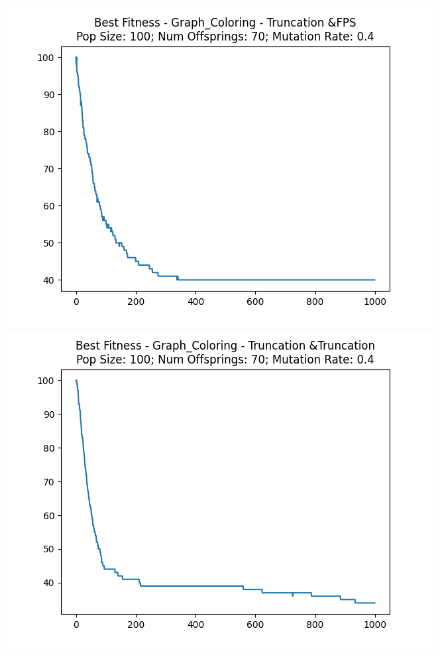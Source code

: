 \documentclass[12pt]{report}
\theoremstyle{mytheoremstyle}
\theoremstyle{mytheoremstyle}
\theoremstyle{myproblemstyle}
\begin{document}
\begin{figure}[!]
\begin{minipage}{0.4\textwidth}
		\includegraphics[width=\linewidth]{../Analysis/BSF_Graph_Coloring_3_0_100_70.png}
	\end{minipage}
	\hspace{\fill}
	\begin{minipage}{0.4\textwidth}
		\includegraphics[width=\linewidth]{../Analysis/BSF_Graph_Coloring_3_3_100_70.png}
	\end{minipage}
	\vspace*{1cm}
	\begin{minipage}{0.4\textwidth}

\end{minipage}
\end{figure}
\end{document}
